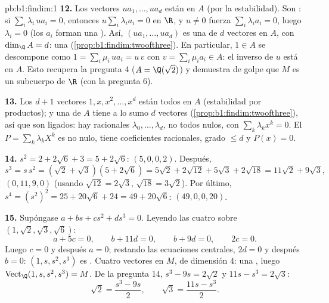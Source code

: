 \begin{solution}{pb:b1:findim:1}
\textbf{12.} Los vectores $u a_1, \dots, u a_d$ están en $A$ (por la
estabilidad). Son : si $\sum_i \lambda_i\, u a_i = 0$, entonces
$u \sum_i \lambda_i a_i = 0$ en $\R$, y $u \neq 0$ fuerza
$\sum_i \lambda_i a_i = 0$, luego $\lambda_i = 0$ (los $a_i$ forman
una ). Así, $(u a_1, \dots, u a_d)$ es una  de $d$
vectores en $A$, con $\dim_\Q A = d$: una 
(\cref{prop:b1:findim:twoofthree}). En particular, $1 \in A$ se
descompone como $1 = \sum_i \mu_i\, u a_i = u\,v$ con
$v = \sum_i \mu_i a_i \in A$: el inverso de $u$ está en $A$. Esto
recupera la pregunta 4 ($A = \Q(\sqrt2)$) y demuestra de golpe que
$M$ es un subcuerpo de $\R$ (con la pregunta 6).

\textbf{13.} Los $d + 1$ vectores $1, x, x^2, \dots, x^{d}$ están
todos en $A$ (estabilidad por productos); y una  de $A$
tiene a lo sumo $d$ vectores (\cref{prop:b1:findim:twoofthree}), así
que son ligados: hay racionales $\lambda_0, \dots, \lambda_d$, no
todos nulos, con $\sum_k \lambda_k x^k = 0$. El 
$P = \sum_k \lambda_k X^k$ es no nulo, tiene coeficientes
racionales, grado $\leq d$ y $P(x) = 0$.

\textbf{14.} $s^2 = 2 + 2\sqrt6 + 3 = 5 + 2\sqrt6$: 
$(5, 0, 0, 2)$. Después,
\[
s^3 = s\,s^2 = (\sqrt2 + \sqrt3)(5 + 2\sqrt6)
= 5\sqrt2 + 2\sqrt{12} + 5\sqrt3 + 2\sqrt{18}
= 11\sqrt2 + 9\sqrt3 ,
\]
 $(0, 11, 9, 0)$ (usando $\sqrt{12} = 2\sqrt3$,
$\sqrt{18} = 3\sqrt2$). Por último,
$s^4 = (s^2)^2 = 25 + 20\sqrt6 + 24 = 49 + 20\sqrt6$: 
$(49, 0, 0, 20)$.

\textbf{15.} Supóngase $a + bs + cs^2 + ds^3 = 0$. Leyendo las cuatro
 sobre $(1, \sqrt2, \sqrt3, \sqrt6)$:
\[
a + 5c = 0,\qquad b + 11d = 0,\qquad b + 9d = 0,\qquad 2c = 0 .
\]
Luego $c = 0$ y después $a = 0$; restando las ecuaciones centrales,
$2d = 0$ y después $b = 0$: $(1, s, s^2, s^3)$ es . Cuatro
vectores  en $M$, de dimensión $4$: una , luego
$\operatorname{Vect}_\Q(1, s, s^2, s^3) = M$. De la pregunta 14,
$s^3 - 9s = 2\sqrt2$ y $11s - s^3 = 2\sqrt3$:
\[
\sqrt2 = \frac{s^3 - 9s}{2},
\qquad
\sqrt3 = \frac{11s - s^3}{2} .
\]


\end{solution}
